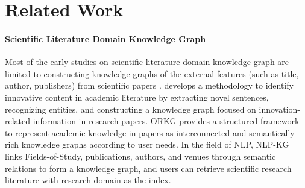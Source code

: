 \section{Related Work}
\paragraph{Scientific Literature Domain Knowledge Graph} 
 Most of the early studies on scientific literature domain knowledge graph are limited to constructing knowledge graphs of the external features (such as title, author, publishers) from scientific papers \cite{zhang2019oag,tang2008arnetminer}. \citet{rs13132511} develops a methodology to identify innovative content in academic literature by extracting novel sentences, recognizing entities, and constructing a knowledge graph focused on innovation-related information in research papers.
 ORKG \cite{jaradeh2019open} provides a structured framework to represent academic knowledge in papers as interconnected and semantically rich knowledge graphs according to user needs. In the field of NLP, NLP-KG \cite{schopf-matthes-2024-nlp} links Fields-of-Study, publications, authors, and venues through semantic relations to form a knowledge graph, and users can retrieve scientific research literature with research domain as the index.
